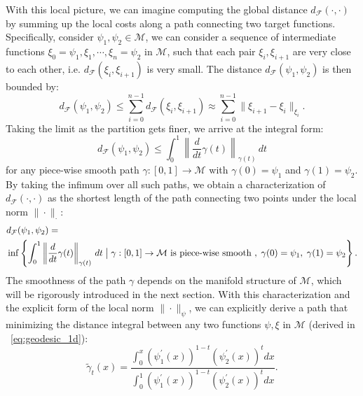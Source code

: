\documentclass[12pt]{amsart}
\numberwithin{equation}{section}
\theoremstyle{remark}
\newcommand{\ql}[1]{\texttt{\color{cyan} QL: \footnotesize #1}}
\begin{document}
With this local picture, we can imagine computing the global distance $d_{\mathcal F}(\cdot, \cdot)$ by summing up the local costs along a path connecting two target functions. Specifically, consider $\psi_1, \psi_2 \in \mathcal M$, we can consider a sequence of intermediate functions $\xi_0 = \psi_1, \xi_1, \cdots, \xi_n = \psi_2$ in $\mathcal M$, such that each pair $\xi_{i}, \xi_{i+1}$ are very close to each other, i.e. $d_{\mathcal F}(\xi_i, \xi_{i+1})$ is very small. The distance $d_{\mathcal F}(\psi_1, \psi_2)$ is then bounded by:
\begin{equation}
    d_{\mathcal F}(\psi_1, \psi_2) \le \sum_{i=0}^{n-1} d_{\mathcal F}(\xi_i, \xi_{i+1}) \approx \sum_{i=0}^{n-1} \|\xi_{i+1}-\xi_i\|_{\xi_i}.
\end{equation}
Taking the limit as the partition gets finer, we arrive at the integral form:
\begin{equation}
    d_{\mathcal F}(\psi_1, \psi_2)
    \le \int_0^1 \left\|\frac{d}{dt}\gamma(t)\right\|_{\gamma(t)}\, dt
\end{equation}
for any piece-wise smooth path $\gamma:[0,1]\to \mathcal M$ with $\gamma(0) = \psi_1$ and $\gamma(1) = \psi_2$. By taking the infimum over all such paths, we obtain a characterization of $d_{\mathcal F}(\cdot, \cdot)$ as the shortest length of the path connecting two points under the local norm $\|\cdot\|_{\cdot}$:
\begin{equation}
    \label{eq:global_distance_variational_relu}
    \begin{aligned}
    &d_{\mathcal F}(\psi_1, \psi_2) = \\
    &\inf
    \left\{ \int_0^1
    \left\|\frac{d}{dt}\gamma(t) \right\|_{\gamma(t)}\,dt
    \bigm| \gamma:[0,1]\to\mathcal M \text{ is piece-wise smooth },\; \gamma(0)=\psi_1,\; \gamma(1)=\psi_2 \right\}.
    \end{aligned}
\end{equation}
The smoothness of the path $\gamma$ depends on the manifold structure of $\mathcal M$, which will be rigorously introduced in the next section.
With this characterization and the explicit form of the local norm $\|\cdot\|_{\psi}$, we can explicitly derive a path that minimizing the distance integral between any two functions $\psi,\xi$ in $\mathcal M$ (derived in ~\eqref{eq:geodesic_1d}):
\begin{equation}
    \tilde \gamma_t(x)  = \frac{\int_0^x(\psi_1^\prime(x))^{1-t}(\psi_2^\prime(x))^t dx}{\int_0^1 (\psi_1^\prime(x))^{1-t}(\psi_2^\prime(x))^t dx}.
\end{equation}
\end{document}
